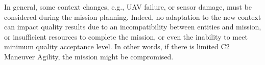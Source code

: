 In general, some context changes, e.g., UAV failure, or sensor damage, must be considered during the mission planning. Indeed, no adaptation to the new context can impact quality results due to an incompatibility between entities and mission, or insufficient resources to complete the mission, or even the inability to meet minimum quality acceptance level. In other words, if there is limited C2 Maneuver Agility, the mission might be compromised.


